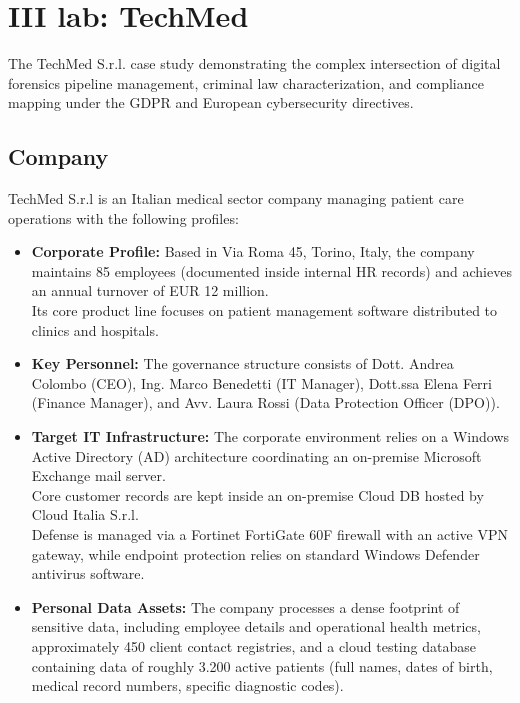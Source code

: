 \section{III lab: TechMed}

The TechMed S.r.l. case study demonstrating the complex intersection of digital forensics pipeline management, criminal law characterization, and compliance mapping under the GDPR and European cybersecurity directives. 



\subsection{Company}
TechMed S.r.l is an Italian medical sector company managing patient care operations with the following profiles:
\begin{itemize}
    \item \textbf{Corporate Profile:} Based in Via Roma 45, Torino, Italy, the company maintains 85 employees (documented inside internal HR records) and achieves an annual turnover of EUR 12 million.\\
    Its core product line focuses on patient management software distributed to clinics and hospitals.
    \item \textbf{Key Personnel:} The governance structure consists of Dott. Andrea Colombo (CEO), Ing. Marco Benedetti (IT Manager), Dott.ssa Elena Ferri (Finance Manager), and Avv. Laura Rossi (Data Protection Officer (DPO)).
    \item \textbf{Target IT Infrastructure:} The corporate environment relies on a Windows Active Directory (AD) architecture coordinating an on-premise Microsoft Exchange mail server.\\
    Core customer records are kept inside an on-premise Cloud DB hosted by Cloud Italia S.r.l.\\
    Defense is managed via a Fortinet FortiGate 60F firewall with an active VPN gateway, while endpoint protection relies on standard Windows Defender antivirus software.
    \item \textbf{Personal Data Assets:} The company processes a dense footprint of sensitive data, including employee details and operational health metrics, approximately 450 client contact registries, and a cloud testing database containing data of roughly 3.200 active patients (full names, dates of birth, medical record numbers, specific diagnostic codes).
\end{itemize}

